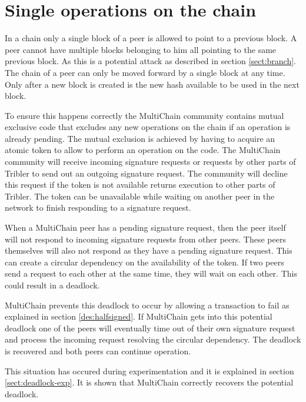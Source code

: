 \section{Single operations on the chain}
\label{sect:deadlock}
In a chain only a single block of a peer is allowed to point to a previous block.
A peer cannot have multiple blocks belonging to him all pointing to the same previous block.
As this is a potential attack as described in section \ref{sect:branch}.
The chain of a peer can only be moved forward by a single block at any time.
Only after a new block is created is the new hash available to be used in the next block.

To ensure this happens correctly the MultiChain community contains mutual exclusive code
that excludes any new operations on the chain if an operation is already pending.
The mutual exclusion is achieved by having to acquire an atomic token to allow to perform an operation on the code.
The MultiChain community will receive incoming signature requests
or requests by other parts of Tribler to send out an outgoing signature request.
The community will decline this request if the token is not available
returns execution to other parts of Tribler.
The token can be unavailable while waiting on another peer in the network to finish responding to a signature request.

When a MultiChain peer has a pending signature request,
then the peer itself will not respond to incoming signature requests from other peers.
These peers themselves will also not respond as they have a pending signature request.
This can create a circular dependency on the availability of the token.
If two peers send a request to each other at the same time, they will wait on each other.
This could result in a deadlock.

MultiChain prevents this deadlock to occur by allowing a transaction to fail
as explained in section \ref{des:halfsigned}.
If MultiChain gets into this potential deadlock one of the peers will eventually time out of their own signature request
and process the incoming request resolving the circular dependency.
The deadlock is recovered and both peers can continue operation.

This situation has occured during experimentation and it is explained in section \ref{sect:deadlock-exp}.
It is shown that MultiChain correctly recovers the potential deadlock.

